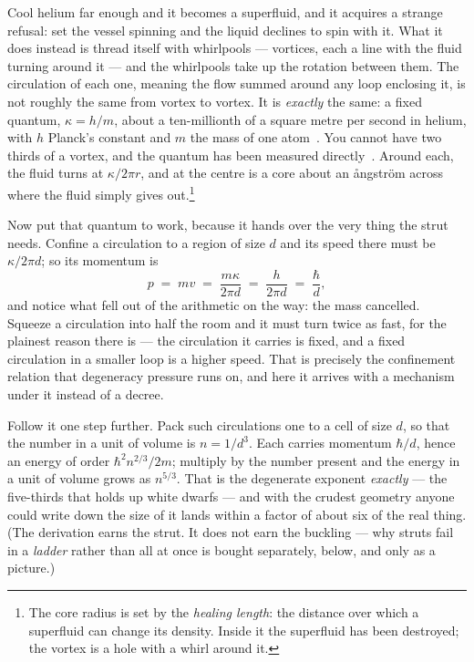 \documentclass[fontsize=11pt,paper=a4,pagesize=auto,parskip=half-]{scrbook}
\begin{document}
Cool helium far enough and it becomes a superfluid, and it acquires a strange refusal: set the vessel spinning and the liquid declines to spin with it. What it does instead is thread itself with whirlpools --- vortices, each a line with the fluid turning around it --- and the whirlpools take up the rotation between them. The circulation of each one, meaning the flow summed around any loop enclosing it, is not roughly the same from vortex to vortex. It is \emph{exactly} the same: a fixed quantum, $\kappa = h/m$, about a ten-millionth of a square metre per second in helium, with $h$ Planck's constant and $m$ the mass of one atom~\cite{onsager1949,feynman1955}. You cannot have two thirds of a vortex, and the quantum has been measured directly~\cite{vinen1961}. Around each, the fluid turns at $\kappa/2\pi r$, and at the centre is a core about an \aa ngstr\"om across where the fluid simply gives out.\footnote{The core radius is set by the \emph{healing length}: the distance over which a superfluid can change its density. Inside it the superfluid has been destroyed; the vortex is a hole with a whirl around it.}

Now put that quantum to work, because it hands over the very thing the strut needs. Confine a circulation to a region of size $d$ and its speed there must be $\kappa/2\pi d$; so its momentum is
\[
p \;=\; m v \;=\; \frac{m\kappa}{2\pi d} \;=\; \frac{h}{2\pi d} \;=\; \frac{\hbar}{d},
\]
and notice what fell out of the arithmetic on the way: the mass cancelled. Squeeze a circulation into half the room and it must turn twice as fast, for the plainest reason there is --- the circulation it carries is fixed, and a fixed circulation in a smaller loop is a higher speed. That is precisely the confinement relation that degeneracy pressure runs on, and here it arrives with a mechanism under it instead of a decree.

Follow it one step further. Pack such circulations one to a cell of size $d$, so that the number in a unit of volume is $n = 1/d^{3}$. Each carries momentum $\hbar/d$, hence an energy of order $\hbar^{2}n^{2/3}/2m$; multiply by the number present and the energy in a unit of volume grows as $n^{5/3}$. That is the degenerate exponent \emph{exactly} --- the five-thirds that holds up white dwarfs --- and with the crudest geometry anyone could write down the size of it lands within a factor of about six of the real thing. (The derivation earns the strut. It does not earn the buckling --- why struts fail in a \emph{ladder} rather than all at once is bought separately, below, and only as a picture.)
\end{document}
